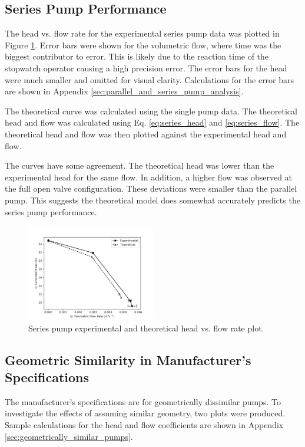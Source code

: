 \subsection{Series Pump Performance}
The head vs. flow rate for the experimental series pump data was plotted in Figure \ref{fig:series_pump_plot}. Error bars were shown for the volumetric flow, where time was the biggest contributor to error. This is likely due to the reaction time of the stopwatch operator causing a high precision error. The error bars for the head were much smaller and omitted for visual clarity. Calculations for the error bars are shown in Appendix \ref{sec:parallel_and_series_pump_analysis}.

The theoretical curve was calculated using the single pump data. The theoretical head and flow was calculated using Eq. \ref{eq:series_head} and \ref{eq:series_flow}. The theoretical head and flow was then plotted against the experimental head and flow.

The curves have some agreement. The theoretical head was lower than the experimental head for the same flow. In addition, a higher flow was observed at the full open valve configuration. These deviations were smaller than the parallel pump. This suggests the theoretical model does somewhat accurately predicts the series pump performance.

\begin{figure}[H]
    \centering
    \includegraphics[width=0.5\textwidth]{Sections/Figures/Series Pump Plot.png}
    \caption{Series pump experimental and theoretical head vs. flow rate plot.}
    \label{fig:series_pump_plot}
\end{figure}

\subsection{Geometric Similarity in Manufacturer's Specifications}
The manufacturer's specifications are for geometrically dissimilar pumps. To investigate the effects of assuming similar geometry, two plots were produced. Sample calculations for the head and flow coefficients are shown in Appendix \ref{sec:geometrically_similar_pumps}.


